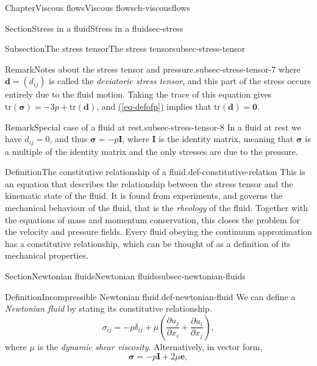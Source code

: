 \documentclass[oneside,10pt,]{book}
\newcommand{\xreffont}{\relax}
\numberwithin{equation}{section}
\newcommand{\pd}[2]{\frac{\partial#1}{\partial#2}}
\newcommand{\be}{\boldsymbol{e}}
\newcommand{\bsigma}{\boldsymbol{\sigma}}
\newcommand{\bd}{\boldsymbol{d}}
\newcommand{\bI}{\boldsymbol{I}}
\begin{document}
\begin{chapterptx}{Chapter}{Viscous flows}{}{Viscous flows}{}{}{ch-viscousflows}
\begin{sectionptx}{Section}{Stress in a fluid}{}{Stress in a fluid}{}{}{sec-stress}
\begin{subsectionptx}{Subsection}{The stress tensor}{}{The stress tensor}{}{}{subsec-stress-tensor}
\begin{remark}{Remark}{Notes about the stress tensor and pressure.}{subsec-stress-tensor-7}
where \(\bd=(d_{ij})\) is called the \emph{deviatoric stress tensor}, and this part of the stress occurs entirely due to the fluid motion. Taking the trace of this equation gives \(\textrm{tr}(\bsigma)=-3p+\textrm{tr}(\bd)\), and \hyperref[eq-defofp]{({\xreffont\ref{eq-defofp}})} implies that \(\textrm{tr}(\bd)=\boldsymbol{0}\).%
\end{remark}
\begin{remark}{Remark}{Special case of a fluid at rest.}{subsec-stress-tensor-8}%
In a fluid at rest we have \(d_{ij}=0\), and thus \(\bsigma=-p\bI\), where \(\bI\) is the identity matrix, meaning that \(\bsigma\) is a multiple of the identity matrix and the only stresses are due to the pressure.%
\end{remark}
\begin{definition}{Definition}{The constitutive relationship of a fluid.}{def-constitutive-relation}%
This is an equation that describes the relationship between the stress tensor and the kinematic state of the fluid. It is found from experiments, and governs the mechanical behaviour of the fluid, that is the \emph{rheology} of the fluid. Together with the equations of mass and momentum conservation, this closes the problem for the velocity and pressure fields. Every fluid obeying the continuum approximation has a constitutive relationship, which can be thought of as a definition of its mechanical properties.%
\end{definition}
\end{subsectionptx}
\end{sectionptx}
%
%
\typeout{************************************************}
\typeout{************************************************}
%
\begin{sectionptx}{Section}{Newtonian fluids}{}{Newtonian fluids}{}{}{subsec-newtonian-fluids}
\begin{definition}{Definition}{Incompressible Newtonian fluid.}{def-newtonian-fluid}%
We can define a \emph{Newtonian fluid} by stating its constitutive relationship.%
\begin{equation}
\sigma_{ij}=-p\delta_{ij}
+\mu\left(\pd{u_j}{x_i}+\pd{u_i}{x_j}\right),\label{eq-Newtonianstress-incompressible}
\end{equation}
where \(\mu\) is the \emph{dynamic shear viscosity}. Alternatively, in vector form,%
\begin{equation}
\bsigma=-p\bI+2\mu\be,\label{eq-Newtonianstress-incompressible-vectorform}
\end{equation}

\end{definition}
\end{sectionptx}
\end{chapterptx}
\end{document}

